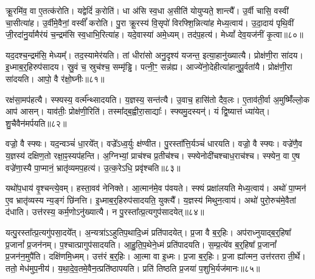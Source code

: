 क्रू॒रमि॑व॒ वा ए॒तत्क॑रोति।
यद्वेदिं॑ क॒रोति॑।
धा अ॑सि स्व॒धा अ॒सीति॑ योयुप्यते॒ शान्त्यै᳚।
उ॒र्वी चासि॒ वस्वी॑ चा॒सीत्या॑ह।
उ॒र्वीमे॒वैनां॒ वस्वीं᳚ करोति।
पु॒रा क्रू॒रस्य॑ वि॒सृपो॑ विरफ्शि॒न्नित्या॑ह मेध्य॒त्वाय॑।
उ॒दा॒दाय॑ पृथि॒वीं जी॒रदा॑नु॒र्यामैर॑यं च॒न्द्रम॑सि स्व॒धाभि॒रित्या॑ह।
यदे॒वास्या॑ अमे॒ध्यम्।
तद॑प॒हत्य॑।
मेध्यां᳚ देव॒यज॑नीं कृ॒त्वा॥८०॥

यद॒दश्च॒न्द्रम॑सि॒ मेध्यम्᳚।
तद॒स्यामेर॑यति।
तां धीरा॑सो अनु॒दृश्य॑ यजन्त॒ इत्या॒हानु॑ख्यात्यै।
प्रोक्ष॑णी॒रा सा॑दय।
इ॒ध्माब॒र्॒\mbox{}हिरुप॑सादय।
स्रु॒वं च॒ स्रुच॑श्च॒ सम्मृ॑ड्ढि।
पत्नी॒ꣳ॒ सन्न॑ह्य।
आज्ये॑नो॒देहीत्या॑हानुपू॒र्वता॑यै।
प्रोक्ष॑णी॒रा सा॑दयति।
आपो॒ वै र॑क्षो॒घ्नीः॥८१॥

रक्ष॑सा॒मप॑हत्यै।
स्फ्यस्य॒ वर्त्म᳚न्थ्सादयति।
य॒ज्ञस्य॒ सन्त॑त्यै।
उ॒वाच॒ हासि॑तो दैव॒लः।
ए॒ताव॑ती॒र्वा अ॒मुष्मिँ॑ल्लो॒क आप॑ आसन्।
याव॑तीः॒ प्रोक्ष॑णी॒रिति॑।
तस्मा᳚द्ब॒ह्वीरा॒साद्याः᳚।
स्फ्यमु॒दस्यन्॑।
यं द्वि॒ष्यात्तं ध्या॑येत्।
शु॒चैवैन॑मर्पयति॥८२॥

वज्रो॒ वै स्फ्यः।
यद॒न्वञ्चं॑ धा॒रये᳚त्।
वज्रे᳚\-ऽध्व॒र्युः क्ष॑ण्वीत।
पु॒रस्ता᳚त्ति॒र्यञ्चं॑ धारयति।
वज्रो॒ वै स्फ्यः।
वज्रे॑णै॒व य॒ज्ञस्य॑ दक्षिण॒तो रक्षा॒ꣴ॒स्यप॑हन्ति।
अ॒ग्निभ्यां॒ प्राच॑श्च प्र॒तीच॑श्च।
स्फ्येनोदी॑चश्चाध॒राच॑श्च।
स्फ्येन॒ वा ए॒ष वज्रे॑णा॒स्यै पा॒प्मानं॒ भ्रातृ॑व्यमप॒हत्य॑।
उ॒त्क॒रेऽधि॒ प्रवृ॑श्चति॥८३॥

यथो॑प॒धाय॑ वृ॒श्चन्त्ये॒वम्।
हस्ता॒वव॑ नेनिक्ते।
आ॒त्मान॑मे॒व प॑वयते।
स्फ्यं प्रक्षा॑लयति मेध्य॒त्वाय॑।
अथो॑ पा॒प्मन॑ ए॒व भ्रातृ॑व्यस्य न्य॒ङ्गं छि॑नत्ति।
इ॒ध्माब॒र्॒\mbox{}हिरुप॑सादयति॒ युक्त्यै᳚।
य॒ज्ञस्य॑ मिथुन॒त्वाय॑।
अथो॑ पुरो॒रुच॑मे॒वैतां द॑धाति।
उत्त॑रस्य॒ कर्म॒णो\-ऽनु॑ख्यात्यै।
न पु॒रस्ता᳚त्प्र॒त्यगुप॑सादयेत्॥८४॥

यत्पु॒रस्ता᳚त्प्र॒त्यगु॑पसा॒दये᳚त्।
अ॒न्यत्रा॑ऽऽहुतिप॒थादि॒ध्मं प्रति॑\-पादयेत्।
प्र॒जा वै ब॒र्॒हिः।
अप॑राध्नुयाद्ब॒र्॒हिषा᳚ प्र॒जानां᳚ प्र॒जन॑नम्।
प॒श्चात्प्रागुप॑सादयति।
आ॒हु॒ति॒प॒थेने॒ध्मं प्रति॑\-पादयति।
स॒म्प्र॒त्ये॑व ब॒र्॒हिषा᳚ प्र॒जानां᳚ प्र॒जन॑न॒मुपै॑ति।
दक्षि॑णमि॒ध्मम्।
उत्त॑रं ब॒र्॒हिः।
आ॒त्मा वा इ॒ध्मः।
प्र॒जा ब॒र्॒हिः।
प्र॒जा ह्या᳚त्मन॒ उत्त॑रतरा ती॒र्थे।
ततो॒ मेध॑मुप॒नीय॑।
य॒था॒दे॒व॒तमे॒वैन॒त्प्रति॑\-ष्ठापयति।
प्रति॑ तिष्ठति प्र॒जया॑ प॒शुभि॒र्यज॑मानः॥८५॥\anuvakamend[वृ॒श्च॒ति॒ सा॒द॒ये॒दि॒ध्मः पञ्च॑ च]




\clearpage
{}
\setcounter{anuvakam}{0}

